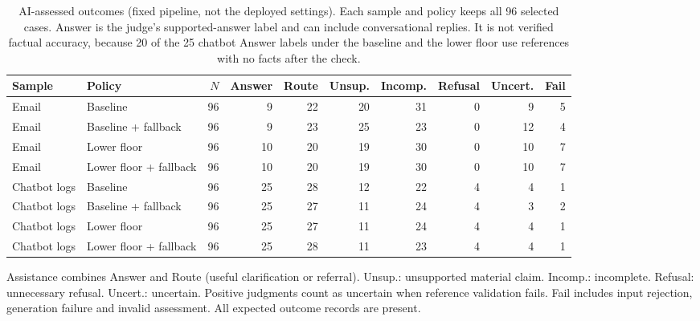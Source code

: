 \begin{table}[t]
\centering\small
\setlength{\tabcolsep}{5pt}
\caption{AI-assessed outcomes (fixed pipeline, not the deployed settings). Each sample and policy keeps all 96 selected cases. Answer is the judge's supported-answer label and can include conversational replies. It is not verified factual accuracy, because 20 of the 25 chatbot Answer labels under the baseline and the lower floor use references with no facts after the check.}
\label{tab:luna-outcomes}
\begin{tabular}{llrrrrrrrr}
\toprule
Sample & Policy & $N$ & Answer & Route & Unsup. & Incomp. & Refusal & Uncert. & Fail \\
\midrule
Email & Baseline & 96 & 9 & 22 & 20 & 31 & 0 & 9 & 5 \\
Email & Baseline + fallback & 96 & 9 & 23 & 25 & 23 & 0 & 12 & 4 \\
Email & Lower floor & 96 & 10 & 20 & 19 & 30 & 0 & 10 & 7 \\
Email & Lower floor + fallback & 96 & 10 & 20 & 19 & 30 & 0 & 10 & 7 \\
Chatbot logs & Baseline & 96 & 25 & 28 & 12 & 22 & 4 & 4 & 1 \\
Chatbot logs & Baseline + fallback & 96 & 25 & 27 & 11 & 24 & 4 & 3 & 2 \\
Chatbot logs & Lower floor & 96 & 25 & 27 & 11 & 24 & 4 & 4 & 1 \\
Chatbot logs & Lower floor + fallback & 96 & 25 & 28 & 11 & 23 & 4 & 4 & 1 \\
\bottomrule
\end{tabular}
\par\smallskip\begin{minipage}{0.94\textwidth}\footnotesize Assistance combines Answer and Route (useful clarification or referral). Unsup.: unsupported material claim. Incomp.: incomplete. Refusal: unnecessary refusal. Uncert.: uncertain. Positive judgments count as uncertain when reference validation fails. Fail includes input rejection, generation failure and invalid assessment. All expected outcome records are present.\end{minipage}
\end{table}
